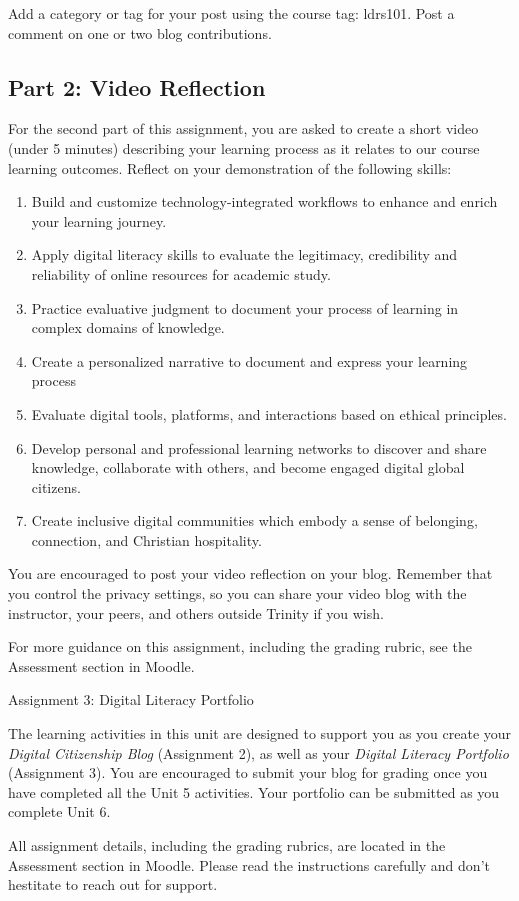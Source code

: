 \documentclass[
]{book}
\providecommand{\tightlist}{%
  \setlength{\itemsep}{0pt}\setlength{\parskip}{0pt}}
\theoremstyle{definition}
\theoremstyle{definition}
\theoremstyle{definition}
\theoremstyle{definition}
\theoremstyle{remark}
\begin{document}
\begin{assessment}
Add a category or tag for your post using the course tag: ldrs101. Post a comment on one or two blog contributions.

\hypertarget{part-2-video-reflection}{%
\subsection*{Part 2: Video Reflection}\label{part-2-video-reflection}}

For the second part of this assignment, you are asked to create a short video (under 5 minutes) describing your learning process as it relates to our course learning outcomes. Reflect on your demonstration of the following skills:

\begin{enumerate}
\def\labelenumi{\arabic{enumi}.}
\tightlist
\item
  Build and customize technology-integrated workflows to enhance and enrich your learning journey.
\item
  Apply digital literacy skills to evaluate the legitimacy, credibility and reliability of online resources for academic study.
\item
  Practice evaluative judgment to document your process of learning in complex domains of knowledge.
\item
  Create a personalized narrative to document and express your learning process
\item
  Evaluate digital tools, platforms, and interactions based on ethical principles.
\item
  Develop personal and professional learning networks to discover and share knowledge, collaborate with others, and become engaged digital global citizens.
\item
  Create inclusive digital communities which embody a sense of belonging, connection, and Christian hospitality.
\end{enumerate}

You are encouraged to post your video reflection on your blog. Remember that you control the privacy settings, so you can share your video blog with the instructor, your peers, and others outside Trinity if you wish.

For more guidance on this assignment, including the grading rubric, see the Assessment section in Moodle.
\end{assessment}

\begin{assessment}
{Assignment 3: Digital Literacy Portfolio}

The learning activities in this unit are designed to support you as you create your \emph{Digital Citizenship Blog} (Assignment 2), as well as your \emph{Digital Literacy Portfolio} (Assignment 3). You are encouraged to submit your blog for grading once you have completed all the Unit 5 activities. Your portfolio can be submitted as you complete Unit 6.

All assignment details, including the grading rubrics, are located in the Assessment section in Moodle. Please read the instructions carefully and don't hestitate to reach out for support.
\end{assessment}
\end{document}
